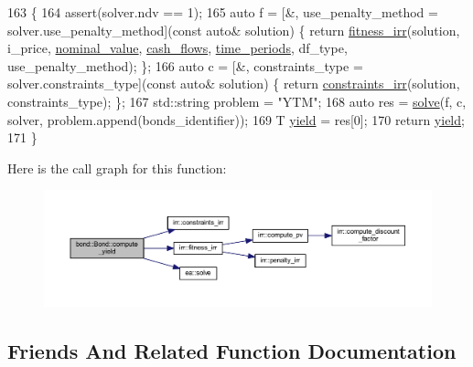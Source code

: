 \begin{DoxyCode}
163     \{
164         assert(solver.ndv == 1);
165         \textcolor{keyword}{auto} f = [&, use\_penalty\_method = solver.use\_penalty\_method](\textcolor{keyword}{const} \textcolor{keyword}{auto}& solution) \{ \textcolor{keywordflow}{return} 
      \hyperlink{namespaceirr_aced01c5e5ef9e171a3b892275d442f8d}{fitness\_irr}(solution, i\_price, \hyperlink{classbond_1_1_bond_a7a79ca13c060697765f13140eb471b84}{nominal\_value}, \hyperlink{classbond_1_1_bond_ae98011d18cd97942b45f5868a42bf668}{cash\_flows}, 
      \hyperlink{classbond_1_1_bond_ac3db034ebeff1f6cd2ed7061fda27fad}{time\_periods}, df\_type, use\_penalty\_method); \};
166         \textcolor{keyword}{auto} c = [&, constraints\_type = solver.constraints\_type](\textcolor{keyword}{const} \textcolor{keyword}{auto}& solution) \{ \textcolor{keywordflow}{return} 
      \hyperlink{namespaceirr_a6801aa96a307b3f52817dd1a3bcd065e}{constraints\_irr}(solution, constraints\_type); \};
167         std::string problem = \textcolor{stringliteral}{"YTM"};
168         \textcolor{keyword}{auto} res = \hyperlink{namespaceea_a6450b5bf61e9fdca8b6c19267e14c560}{solve}(f, c, solver, problem.append(bonds\_identifier));
169         T \hyperlink{classbond_1_1_bond_ac79ec630d68f58775849145ab305d5f8}{yield} = res[0];
170         \textcolor{keywordflow}{return} \hyperlink{classbond_1_1_bond_ac79ec630d68f58775849145ab305d5f8}{yield};
171     \}
\end{DoxyCode}
Here is the call graph for this function\+:
\nopagebreak
\begin{figure}[H]
\begin{center}
\leavevmode
\includegraphics[width=350pt]{classbond_1_1_bond_ab4dba13e68b2685eef680fe7b8155a7a_cgraph}
\end{center}
\end{figure}


\subsection{Friends And Related Function Documentation}
\mbox{\label{classbond_1_1_bond_aa0950c8d07f76b3cb69c5655951e1386}} 
